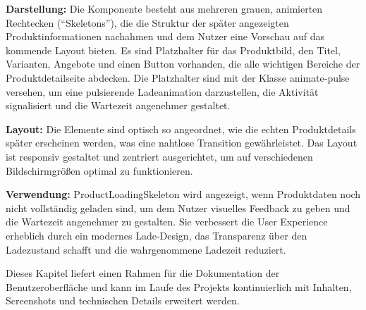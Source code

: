 \textbf{Darstellung:}
Die Komponente besteht aus mehreren grauen, animierten Rechtecken (``Skeletons''), die die Struktur der später angezeigten Produktinformationen nachahmen und dem Nutzer eine Vorschau auf das kommende Layout bieten. Es sind Platzhalter für das Produktbild, den Titel, Varianten, Angebote und einen Button vorhanden, die alle wichtigen Bereiche der Produktdetailseite abdecken. Die Platzhalter sind mit der Klasse animate-pulse versehen, um eine pulsierende Ladeanimation darzustellen, die Aktivität signalisiert und die Wartezeit angenehmer gestaltet.

\textbf{Layout:}
Die Elemente sind optisch so angeordnet, wie die echten Produktdetails später erscheinen werden, was eine nahtlose Transition gewährleistet. Das Layout ist responsiv gestaltet und zentriert ausgerichtet, um auf verschiedenen Bildschirmgrößen optimal zu funktionieren.

\noindent\textbf{Verwendung:} ProductLoadingSkeleton wird angezeigt, wenn Produktdaten noch nicht vollständig geladen sind, um dem Nutzer visuelles Feedback zu geben und die Wartezeit angenehmer zu gestalten. Sie verbessert die User Experience erheblich durch ein modernes Lade-Design, das Transparenz über den Ladezustand schafft und die wahrgenommene Ladezeit reduziert.

\vspace{1em}
\noindent
Dieses Kapitel liefert einen Rahmen für die Dokumentation der Benutzeroberfläche und kann im Laufe des Projekts kontinuierlich mit Inhalten, Screenshots und technischen Details erweitert werden.

